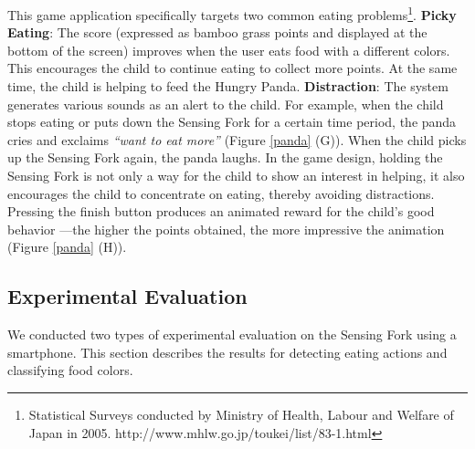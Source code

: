 This game application specifically targets 
two common eating problems\footnote{Statistical Surveys conducted by Ministry of Health, 
\newline Labour and Welfare of Japan in 2005. 
\newline http://www.mhlw.go.jp/toukei/list/83-1.html}. 
\textbf{Picky Eating}: 
The score (expressed as bamboo grass points and displayed at the bottom of the screen) improves 
when the user eats food with a different colors. 
This encourages the child to continue eating to collect more points. 
At the same time, the child is helping to feed the Hungry Panda. 
\textbf{Distraction}: 
The system generates various sounds as an alert to the child. 
For example, when the child stops eating or 
puts down the Sensing Fork for a certain time period, 
the panda cries and exclaims \textit{``want to eat more''} (Figure \ref{panda} (G)). 
When the child picks up the Sensing Fork again, the panda laughs. 
In the game design, holding the Sensing Fork is not only a way for the child 
to show an interest in helping, 
it also encourages the child to concentrate on eating, thereby avoiding distractions. 
Pressing the finish button produces an animated reward for the child's good behavior 
---the higher the points obtained, the more impressive the animation (Figure \ref{panda} (H)). 

\subsection{Experimental Evaluation}
We conducted two types of experimental evaluation on the Sensing Fork using a smartphone. 
This section describes the results for detecting eating actions and classifying food colors. 

